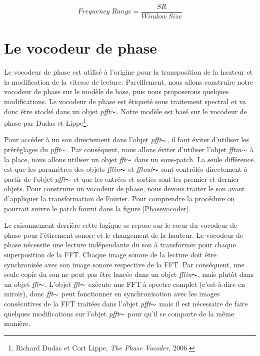     \begin{equation*}
        Frequency \; Range = \frac{SR}{Window \; Size}
    \end{equation*}

\section{Le vocodeur de phase}

Le vocodeur de phase est utilisé à l'origine pour la transposition de la hauteur et la modification de la vitesse de lecture. Pareillement, nous allons construire notre vocodeur de phase sur le modèle de base, puis nous proposerons quelques modifications. Le vocodeur de phase est étiqueté sous traitement spectral et va donc être stocké dans un objet \textit{pfft}$\thicksim $. Notre modèle est basé sur le vocodeur de phase par Dudas et Lippe\footnote{Richard Dudas et Cort Lippe, \textit{The Phase Vocoder}, 2006. \nocite{DL07} \nocite{DL06}}.

Pour accéder à un son directement dans l’objet \textit{pfft}$\thicksim$, il faut éviter d'utiliser les préréglages du  \textit{pfft}$\thicksim $. Par conséquent, nous allons éviter d'utiliser l'objet \textit{fftin}$ \thicksim $ à la place, nous allons utiliser un objet \textit{fft}$\thicksim $ dans un sous-patch. La seule différence est que les paramètres des objets \textit{fftin}$\thicksim $ et \textit{fftout}$\thicksim$ sont contrôlés directement à partir de l'objet  \textit{pfft}$\thicksim $ et que les entrées et sorties sont les premier et dernier objets. Pour construire un vocodeur de phase, nous devons traiter le son avant d'appliquer la transformation de Fourier. Pour comprendre la procédure on pourrait suivre le patch fourni dans la figure \ref{Phasevocoder}.

Le raisonnement derrière cette logique se repose sur le cœur du vocodeur de phase pour l'étirement sonore et le changement de la hauteur. Le vocodeur de phase nécessite une lecture indépendante du son à transformer pour chaque superposition de la FFT. Chaque image sonore de la lecture doit être synchronisée avec son image sonore respective de la FFT. Par conséquent, une seule copie du son ne peut pas être lancée dans un objet \textit{fftin}$\thicksim$, mais plutôt dans un objet \textit{fft}$\thicksim$. L'objet \textit{fft}$\thicksim$ exécute une FFT à spectre complet (c'est-à-dire en miroir), donc \textit{fft}$\thicksim$ peut fonctionner en synchronisation avec les images consécutives de la FFT traitées dans l'objet \textit{pfft}$\thicksim$ mais il est nécessaire de faire quelques modifications sur l'objet \textit{pfft}$\thicksim$ pour qu'il se comporte de la même manière.

